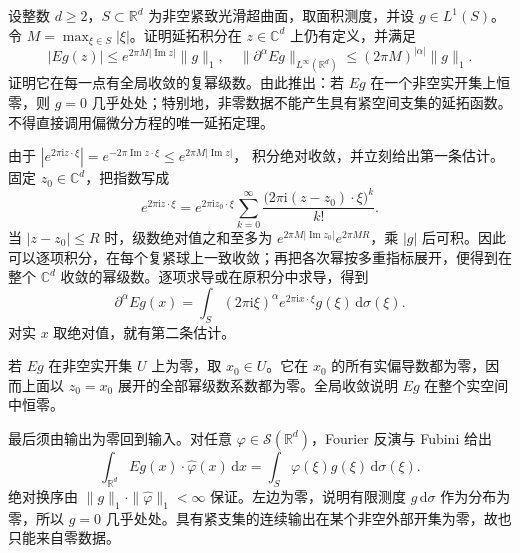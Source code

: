 \begin{exercise}\label{b2:ex:23-new-6}
设整数 \(d\geq2\)，\(S\subset\mathbb R^d\) 为非空紧致光滑超曲面，取面积测度，并设 \(g\in L^1(S)\)。令 \(M=\max_{\xi\in S}|\xi|\)。证明延拓积分在 \(z\in\mathbb C^d\) 上仍有定义，并满足
\[
 |Eg(z)|\leq e^{2\pi M|\operatorname{Im}z|}\|g\|_1,
 \quad
 \|\partial^\alpha Eg\|_{L^\infty(\mathbb R^d)}
       \leq(2\pi M)^{|\alpha|}\|g\|_1.
\]
证明它在每一点有全局收敛的复幂级数。由此推出：若 \(Eg\) 在一个非空实开集上恒零，则 \(g=0\) 几乎处处；特别地，非零数据不能产生具有紧空间支集的延拓函数。不得直接调用偏微分方程的唯一延拓定理。
\end{exercise}
\begin{solution}
由于
\(\left|e^{2\pi\mathrm i z\cdot\xi}\right|
=e^{-2\pi\operatorname{Im}z\cdot\xi}\leq e^{2\pi M|\operatorname{Im}z|}\)，
积分绝对收敛，并立刻给出第一条估计。固定 \(z_0\in\mathbb C^d\)，把指数写成
\[
 e^{2\pi\mathrm i z\cdot\xi}
 =e^{2\pi\mathrm i z_0\cdot\xi}
   \sum_{k=0}^\infty\frac{\bigl(2\pi\mathrm i(z-z_0)\cdot\xi\bigr)^k}{k!}.
\]
当 \(|z-z_0|\leq R\) 时，级数绝对值之和至多为
\(e^{2\pi M|\operatorname{Im}z_0|}e^{2\pi MR}\)，乘 \(|g|\) 后可积。因此可以逐项积分，在每个复紧球上一致收敛；再把各次幂按多重指标展开，便得到在整个 \(\mathbb C^d\) 收敛的幂级数。逐项求导或在原积分中求导，得到
\[
 \partial^\alpha Eg(x)
 =\int_S(2\pi\mathrm i\xi)^\alpha
             e^{2\pi\mathrm i x\cdot\xi}g(\xi)\,\mathrm d\sigma(\xi).
\]
对实 \(x\) 取绝对值，就有第二条估计。

若 \(Eg\) 在非空实开集 \(U\) 上为零，取 \(x_0\in U\)。它在 \(x_0\) 的所有实偏导数都为零，因而上面以 \(z_0=x_0\) 展开的全部幂级数系数都为零。全局收敛说明 \(Eg\) 在整个实空间中恒零。

最后须由输出为零回到输入。对任意 \(\varphi\in\mathcal S(\mathbb R^d)\)，Fourier 反演与 Fubini 给出
\[
 \int_{\mathbb R^d}Eg(x)\cdot\widehat\varphi(x)\,\mathrm dx
 =\int_S\varphi(\xi)g(\xi)\,\mathrm d\sigma(\xi).
\]
绝对换序由 \(\|g\|_1\cdot\|\widehat\varphi\|_1<\infty\) 保证。左边为零，说明有限测度 \(g\,\mathrm d\sigma\) 作为分布为零，所以 \(g=0\) 几乎处处。具有紧支集的连续输出在某个非空外部开集为零，故也只能来自零数据。
\end{solution}

